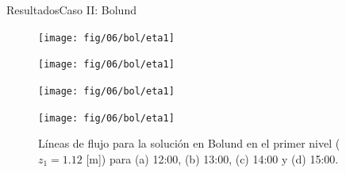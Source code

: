 \documentclass[mathserif,10pt]{beamer}
\begin{document}
\begin{frame}{Resultados}{Caso II: Bolund}
	\begin{figure}[H]
		\begin{minipage}{0.5\linewidth}
			\centering
			\texttt{[image: fig/06/bol/eta1]}%
		\end{minipage}%
		\begin{minipage}{0.5\linewidth}
			\centering
			\texttt{[image: fig/06/bol/eta1]}%
		\end{minipage}%
		\vspace{1mm}
		
		\begin{minipage}{0.5\linewidth}
			\centering
			\texttt{[image: fig/06/bol/eta1]}%
		\end{minipage}%
		\begin{minipage}{0.5\linewidth}
			\centering
			\texttt{[image: fig/06/bol/eta1]}%
		\end{minipage}%
		\caption{Líneas de flujo para la solución en Bolund en el primer nivel ($z_1 = 1.12$ [m]) para (a) 12:00, (b) 13:00, (c) 14:00 y (d) 15:00.}
		\label{fig:06_bol_st}
	\end{figure}
\end{frame}
\end{document}
